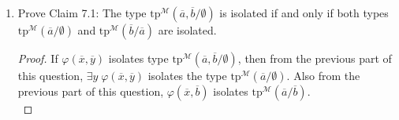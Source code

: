 \documentclass{article}
\begin{document}
\begin{enumerate}[label={\bf Q\arabic*:}]
\begin{enumerate}
\begin{proof}
          The second assertion can be proven in a similar manner. Assume by
          contradiction that $\varphi(x,b)$ does not isolate
          $\text{tp}^{\mathcal{M}}(a/b)$. Then there must exist a formula
          $\theta(x,b)\in\text{tp}^{\mathcal{M}}(a/b)$ such that
          $\mathcal{M}\not\models\varphi(x,b)\rightarrow\theta(x,b)$. This
          means there exists $a'\in M$ such that
          $\mathcal{M}\models\varphi(a',b)\wedge\neg\theta(a',b)$, which
          means $\mathcal{M}\not\models\varphi(x,y)\rightarrow\theta(x,y)$.
          However, since
          $\theta(x,y)\in\text{tp}^{\mathcal{M}}(a,b/\emptyset)$, the
          statement contradicts $\varphi(x,y)$ isolating
          $\text{tp}^{\mathcal{M}}(a,b/\emptyset)$. \\
        \end{proof}

      \item Prove Claim 7.1: The type
        $\text{tp}^{\mathcal{M}}(\overline{a},\overline{b}/\emptyset)$ is
        isolated if and only if both types
        $\text{tp}^{\mathcal{M}}(\overline{a}/\emptyset)$ and
        $\text{tp}^{\mathcal{M}}(\overline{b}/\overline{a})$ are isolated.

        \begin{proof}
          If $\varphi(\overline{x},\overline{y})$ isolates type
          $\text{tp}^{\mathcal{M}}(\overline{a},\overline{b}/\emptyset)$,
          then from the previous part of this question, $\exists y\;
          \varphi(\overline{x},\overline{y})$ isolates the type
          $\text{tp}^{\mathcal{M}}(\overline{a}/\emptyset)$. Also from the
          previous part of this question,
          $\varphi(\overline{x},\overline{b})$ isolates
          $\text{tp}^{\mathcal{M}}(\overline{a}/\overline{b})$. \\


\end{proof}
\end{enumerate}
\end{enumerate}
\end{document}
